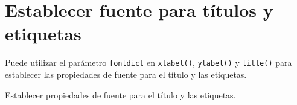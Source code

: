 \section{Establecer fuente para títulos y etiquetas}

Puede utilizar el parámetro \texttt{fontdict} en \texttt{xlabel()},
\texttt{ylabel()} y \texttt{title()} para establecer las propiedades de
fuente para el título y las etiquetas.

\begin{code} Establecer propiedades de fuente para el título y las etiquetas.

\begin{Shaded}
\begin{Highlighting}[]

\OperatorTok{=}\NormalTok{ np.array([}\NormalTok{, }\NormalTok{, }\NormalTok{, }\NormalTok{, }\NormalTok{, }\NormalTok{, }\NormalTok{, }\NormalTok{, }\NormalTok{, }\NormalTok{])}
\OperatorTok{=}\NormalTok{ np.array([}\NormalTok{, }\NormalTok{, }\NormalTok{, }\NormalTok{, }\NormalTok{, }\NormalTok{, }\NormalTok{, }\NormalTok{, }\NormalTok{, }\NormalTok{])}

\OperatorTok{=}\NormalTok{ \{}\NormalTok{:}\NormalTok{,}\NormalTok{:}\NormalTok{,}\NormalTok{:}\NormalTok{\}}
\OperatorTok{=}\NormalTok{ \{}\NormalTok{:}\NormalTok{,}\NormalTok{:}\NormalTok{,}\NormalTok{:}\NormalTok{\}}

\OperatorTok{=}
\OperatorTok{=}
\OperatorTok{=}


\end{Highlighting}
\end{Shaded}
\end{code}
